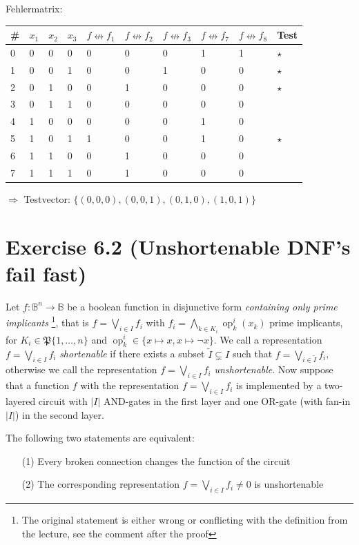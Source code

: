 \documentclass[10pt,a4paper]{scrartcl}
\DeclareMathOperator{\op}{op}
\begin{document}
Fehlermatrix:

\begin{tabular}{|l||lll||l|l|l|l|l||l|}\hline
\# & $x_1$&$x_2$&$x_3$&$f\nleftrightarrow f_1$&$f\nleftrightarrow f_2$&$f\nleftrightarrow f_3$&$f\nleftrightarrow f_7$&$f\nleftrightarrow f_8$ & Test\\\hline\hline
0  & 0&0&0            & 0   & 0   & 0   & 1   & 1 & $\star$ \\
1  & 0&0&1            & 0   & 0   & 1   & 0   & 0 & $\star$ \\
2  & 0&1&0            & 0   & 1   & 0   & 0   & 0 & $\star$ \\
3  & 0&1&1            & 0   & 0   & 0   & 0   & 0 & \\
4  & 1&0&0            & 0   & 0   & 0   & 1   & 0 & \\
5  & 1&0&1            & 1   & 0   & 0   & 1   & 0 & $\star$ \\
6  & 1&1&0            & 0   & 1   & 0   & 0   & 0 & \\
7  & 1&1&1            & 0   & 1   & 0   & 0   & 0 & \\\hline
\end{tabular}

$\Longrightarrow$ Testvector: $\{(0,0,0),(0,0,1),(0,1,0),(1,0,1)\}$

\FloatBarrier
\section*{Exercise 6.2 (Unshortenable DNF's fail fast)}
Let $f: \mathbb{B}^n \to \mathbb{B}$ be a boolean function in disjunctive form \emph{containing only prime implicants}
\footnote{The original statement is either wrong or conflicting with the definition from the lecture, see the comment after the proof}, that is 
$f = \bigvee_{i \in I} f_i$ with $f_i = \bigwedge_{k \in K_i} \op_k^i(x_k)$ prime implicants, for 
$K_i \in \mathfrak{P}\{1,\dots,n\}$ and $\op_k^i \in \{x \mapsto x, x \mapsto \neg x\}$.
We call a representation $f = \bigvee_{i \in I} f_i$ \emph{shortenable} if there exists
a subset $\tilde I \subsetneq I$ such that $f = \bigvee_{i \in \tilde I} f_i$, otherwise
we call the representation $f = \bigvee_{i \in I} f_i$ \emph{unshortenable}. Now suppose
that a function $f$ with the representation $f = \bigvee_{i \in I} f_i$ is implemented by
a two-layered circuit with $|I|$ AND-gates in the first layer and one OR-gate (with fan-in
$|I|$) in the second layer.

 The following two statements are equivalent:
\begin{itemize}
  \item[(1)] Every broken connection changes the function of the circuit
  \item[(2)] The corresponding representation $f = \bigvee_{i \in I} f_i \neq 0$ is unshortenable
\end{itemize}
\end{document}
